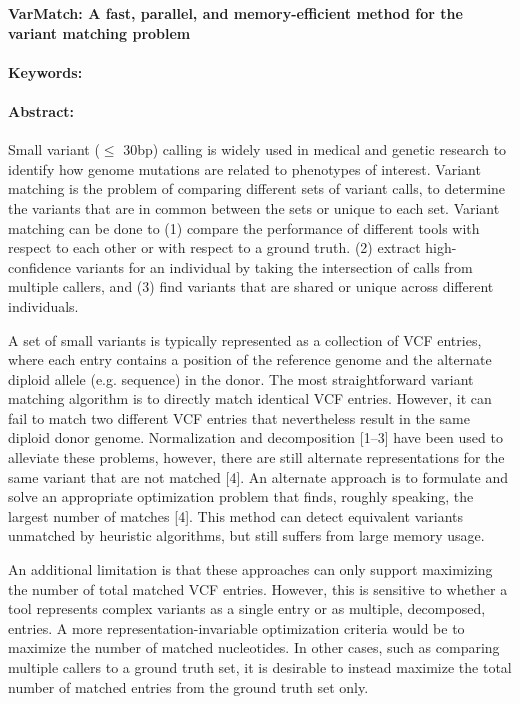 \noindent
\large {\bf VarMatch: A fast, parallel, and memory-efficient method for the variant matching problem} 


\normalsize 


\noindent \paragraph{Keywords:} 

\noindent \paragraph{Abstract:} 

Small variant ($\leq$ 30bp) calling is widely used in medical and genetic research to identify how genome
mutations are related to phenotypes of interest. Variant matching is the problem of comparing different
sets of variant calls, to determine the variants that are in common between the sets or unique to each
set. Variant matching can be done to (1) compare the performance of different tools with respect to each
other or with respect to a ground truth. (2) extract high-confidence variants for an individual by taking
the intersection of calls from multiple callers, and (3) find variants that are shared or unique across
different individuals.

A set of small variants is typically represented as a collection of VCF entries, where each entry contains
a position of the reference genome and the alternate diploid allele (e.g. sequence) in the donor. The most
straightforward variant matching algorithm is to directly match identical VCF entries. However, it can
fail to match two different VCF entries that nevertheless result in the same diploid donor genome.
Normalization and decomposition [1–3] have been used to alleviate these problems, however, there are
still alternate representations for the same variant that are not matched [4]. An alternate approach is
to formulate and solve an appropriate optimization problem that finds, roughly speaking, the largest
number of matches [4]. This method can detect equivalent variants unmatched by heuristic algorithms,
but still suffers from large memory usage.

An additional limitation is that these approaches can only support maximizing the number of total
matched VCF entries. However, this is sensitive to whether a tool represents complex variants as a single
entry or as multiple, decomposed, entries. A more representation-invariable optimization criteria would
be to maximize the number of matched nucleotides. In other cases, such as comparing multiple callers
to a ground truth set, it is desirable to instead maximize the total number of matched entries from the
ground truth set only.



